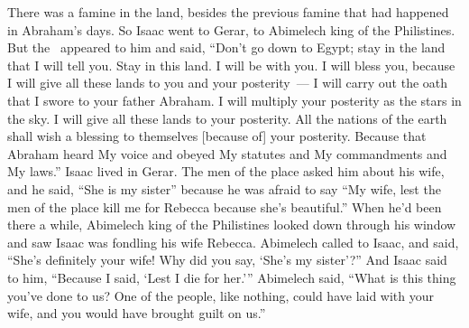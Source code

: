 
\begin{inparaenum}
   There was a famine in the land, besides the previous famine that had happened in Abraham's days. So Isaac went to Gerar, to Abimelech king of the Philistines.%
   But the \lord\ appeared to him and said, ``Don't go down to Egypt; stay in the land that I will tell you.%
   Stay in this land. I will be with you. I will bless you, because I will give all these lands to you and your posterity~--- I will carry out the oath that I swore to your father Abraham.%
   I will multiply your posterity as the stars in the sky. I will give all these lands to your posterity. All the nations of the earth shall wish a blessing to themselves [because of] your posterity.%
   Because that Abraham heard My voice and obeyed My statutes and My commandments and My laws.''%
   Isaac lived in Gerar.%
   The men of the place asked him about his wife, and he said, ``She is my sister'' because he was afraid to say ``My wife, lest the men of the place kill me for Rebecca because she's beautiful.''%
   When he'd been there a while, Abimelech king of the Philistines looked down through his window and saw Isaac was fondling his wife Rebecca.%
   Abimelech called to Isaac, and said, ``She's definitely your wife! Why did you say, `She's my sister'?'' And Isaac said to him, ``Because I said, `Lest I die for her.'\thinspace''%
   Abimelech said, ``What is this thing you've done to us? One of the people, like nothing, could have laid with your wife, and you would have brought guilt on us.''%

\end{inparaenum}
